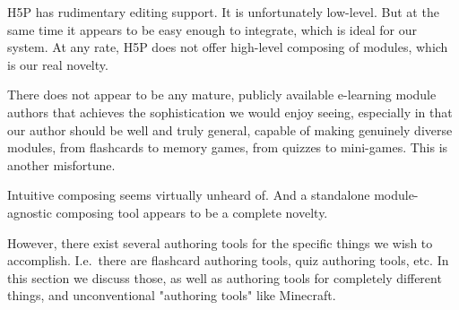 H5P has rudimentary editing support. It is unfortunately low-level. But at the 
same time it appears to be easy enough to integrate, which is ideal for our 
system. At any rate, H5P does not offer high-level composing of modules, which 
is our real novelty.

There does not appear to be any mature, publicly available e-learning module 
authors that achieves the sophistication we would enjoy seeing, especially in 
that our author should be well and truly general, capable of making genuinely 
diverse modules, from flashcards to memory games, from quizzes to mini-games. 
This is another misfortune.

Intuitive composing seems virtually unheard of. And a standalone 
module-agnostic composing tool appears to be a complete novelty.

However, there exist several authoring tools for the specific things we wish 
to accomplish. I.e.\ there are flashcard authoring tools, quiz authoring 
tools, etc. In this section we discuss those, as well as authoring tools for 
completely different things, and unconventional "authoring tools" like 
Minecraft.














